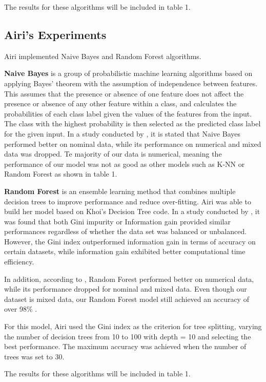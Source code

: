 The results for these algorithms will be included in table 1.

\subsection{Airi's Experiments}

Airi implemented Naive Bayes and Random Forest algorithms.

\textbf{Naive Bayes} is a group of probabilistic machine learning algorithms based on applying Bayes’ theorem with the assumption of independence between features. This assumes that the presence or absence of one feature does not affect the presence or absence of any other feature within a class, and calculates the probabilities of each class label given the values of the features from the input. The class with the highest probability is then selected as the predicted class label for the given input. In a study conducted by \cite{singh2017impact}, it is stated that Naive Bayes performed better on nominal data, while its performance on numerical and mixed data was dropped. Te majority of our data is numerical, meaning the performance of our model was not as good as other models such as K-NN or Random Forest as shown in table 1. 

\textbf{Random Forest} is an ensemble learning method that combines multiple decision trees to improve performance and reduce over-fitting. Airi was able to build her model based on Khoi's Decision Tree code. In a study conducted by \cite{tangirala2020evaluating}, it was found that both Gini impurity or Information gain provided similar performances regardless of whether the data set was balanced or unbalanced. However, the Gini index outperformed information gain in terms of accuracy on certain datasets, while information gain exhibited better computational time efficiency. 

In addition, according to \cite{singh2017impact}, Random Forest performed better on numerical data, while its performance dropped for nominal and mixed data. Even though our dataset is mixed data, our Random Forest model still achieved an accuracy of over 98\% .

For this model, Airi used the Gini index as the criterion for tree splitting, varying the number of decision trees from 10 to 100 with depth = 10 and selecting the best performance. The maximum accuracy was achieved when the number of trees was set to 30.

The results for these algorithms will be included in table 1.

